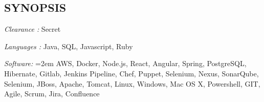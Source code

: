\documentclass[12pt, line, margin]{res}
\begin{document}

\address{
}

\begin{resume}


\section{SYNOPSIS} {\sl Clearance :} Secret

	       {\sl Languages :} Java, SQL, Javascript, Ruby

               {\sl Software:}  
			\hangindent=2em
			AWS, Docker, Node.js, React, Angular, Spring, PostgreSQL,\newline 
			Hibernate, Gitlab, Jenkins Pipeline, Chef, Puppet, Selenium, Nexus,\newline
			SonarQube, Selenium, JBoss, Apache, Tomcat, Linux, Windows,\newline
			Mac OS X, Powershell, GIT, Agile, Scrum, Jira, Confluence\newline


\end{resume}
\end{document}
